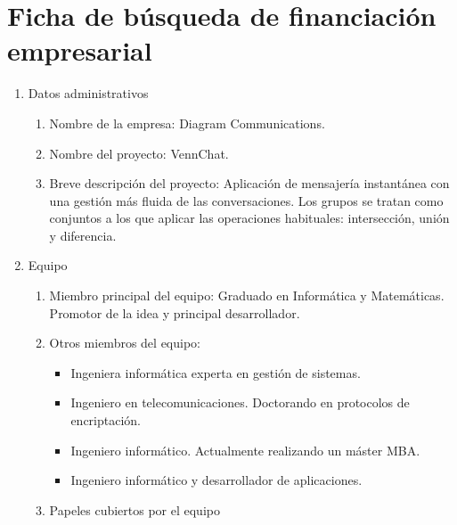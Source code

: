\documentclass[11pt,leqno]{article}
\begin{document}
	 
	 
	 
	 
	 
	 
	 
	 
	 
	 
	 
	 
	 
	 
	 
	 
	 
	 
\newpage
\section{Ficha de búsqueda de financiación empresarial}

\begin{enumerate}
\item  Datos administrativos

	\begin{enumerate}[a]
\item Nombre de la empresa: Diagram Communications. 
\item Nombre del proyecto: VennChat.
\item Breve descripción del proyecto:  Aplicación de mensajería instantánea
con una gestión más fluida de las conversaciones. Los grupos se tratan como 
conjuntos a los que aplicar las operaciones habituales: intersección, unión y
diferencia.

	\end{enumerate}

\item Equipo

\begin{enumerate}[a]
\item Miembro principal del equipo: Graduado en Informática y Matemáticas. Promotor de la idea y principal desarrollador.
\item Otros miembros del equipo: 
	\begin{itemize}
	\item Ingeniera informática experta en gestión de sistemas. 
	\item Ingeniero en telecomunicaciones.
	 Doctorando en protocolos de encriptación.
	\item Ingeniero informático. Actualmente realizando un máster MBA.
	\item Ingeniero informático y desarrollador de aplicaciones.	
	\end{itemize}

\item Papeles cubiertos por el equipo 


\end{enumerate}
\end{enumerate}
\end{document}
